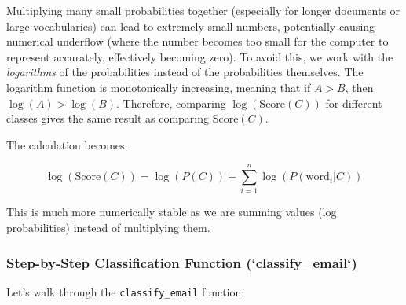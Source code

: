 \documentclass[12pt,a4paper]{article}
\begin{document}
Multiplying many small probabilities together (especially for longer documents or large vocabularies) can lead to extremely small numbers, potentially causing numerical underflow (where the number becomes too small for the computer to represent accurately, effectively becoming zero). To avoid this, we work with the \textit{logarithms} of the probabilities instead of the probabilities themselves. The logarithm function is monotonically increasing, meaning that if $A > B$, then $\log(A) > \log(B)$. Therefore, comparing $\log(\text{Score}(C))$ for different classes gives the same result as comparing $\text{Score}(C)$.

The calculation becomes:

\[\log(\text{Score}(C)) = \log(P(C)) + \sum_{i=1}^{n} \log(P(\text{word}_i | C))\]

This is much more numerically stable as we are summing values (log probabilities) instead of multiplying them.

\subsubsection{Step-by-Step Classification Function (`classify\_email`)}

Let's walk through the \texttt{classify\_email} function:
\end{document}
